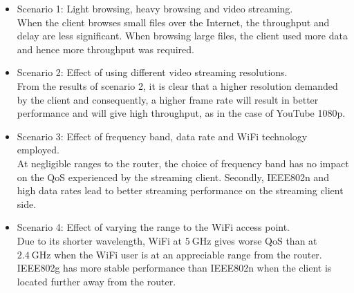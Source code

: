 \begin{itemize}
	\item Scenario 1: Light browsing, heavy browsing and video streaming.  \\
	When the client browses small files over the Internet, the throughput and delay are less significant. When browsing large files, the client used more data and hence more throughput was required. 
	\item  Scenario 2: Effect of using different video streaming resolutions.\\
	From the results of scenario 2, it is clear that a higher resolution demanded by the client and consequently, a higher frame rate will result in better performance and will give high throughput, as in the case of YouTube 1080p.
	\item Scenario 3: Effect of frequency band, data rate and \gls{WiFi} technology employed.\\
	At negligible ranges to the router, the choice of frequency band has no impact on the \gls{QoS} experienced by the streaming client. Secondly, \gls{IEEE802}n and high data rates lead to better streaming performance on the streaming client side.
	\item Scenario 4: Effect of varying the range to the \gls{WiFi} access point. \\
	Due to its shorter wavelength, \gls{WiFi} at $5~\mathrm{GHz}$ gives worse \gls{QoS} than at $2.4~\mathrm{GHz}$ when the \gls{WiFi} user is at an appreciable range from the router. \gls{IEEE802}g has more stable performance than \gls{IEEE802}n when the client is located further away from the router.
\end{itemize}

%
%
%

